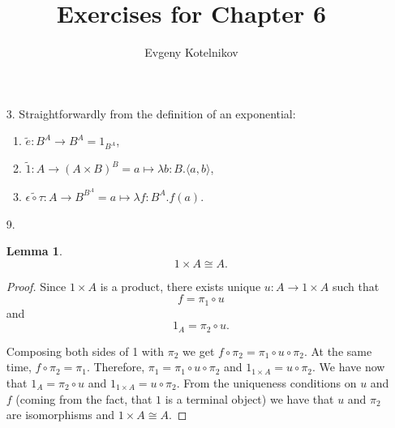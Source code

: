 \documentclass[12pt]{article}
\author{Evgeny Kotelnikov}
\title{Exercises for Chapter 6}
\date{}
\theoremstyle{definition}
\begin{document}
\maketitle

\begin{enumerate}
  \item[3.]
    Straightforwardly from the definition of an exponential:
    \begin{enumerate}
      \item $\tilde{e} : B^A \to B^A = 1_{B^A}$,
      \item $\tilde{1} : A \to (A \times B)^B = a \mapsto \lambda b : B . \langle a , b \rangle$,
      \item $\tilde{\epsilon \circ \tau} : A \to B^{B^A} = a \mapsto \lambda f : B^A . f(a)$.
    \end{enumerate}

  \item[9.]
    \newtheorem*{lemma}{Lemma}
    \begin{lemma}
      \vspace{-1.9em}
      $$1 \times A \cong A.$$
    \end{lemma}
    \begin{proof}
      Since $1 \times A$ is a product, there exists unique $u : A \to 1 \times A$ such that
      \begin{equation}
        \label{eq:f=pu}
        f = \pi_1 \circ u
      \end{equation}
      and
      \begin{equation*}
        1_A = \pi_2 \circ u.
      \end{equation*}
      
      \begin{figure}[H]
        \centering
      \end{figure}
      Composing both sides of 1 with $\pi_2$ we get $f \circ \pi_2 = \pi_1 \circ u \circ \pi_2$. At the same time, $f \circ \pi_2 = \pi_1$. Therefore, $\pi_1 = \pi_1 \circ u \circ \pi_2$ and $1_{1 \times A} = u \circ \pi_2$. We have now that $1_A = \pi_2 \circ u$ and $1_{1 \times A} = u \circ \pi_2$. From the uniqueness conditions on $u$ and $f$ (coming from the fact, that $1$ is a terminal object) we have that $u$ and $\pi_2$ are isomorphisms and $1 \times A \cong A$.
    \end{proof}


\end{enumerate}
\end{document}
